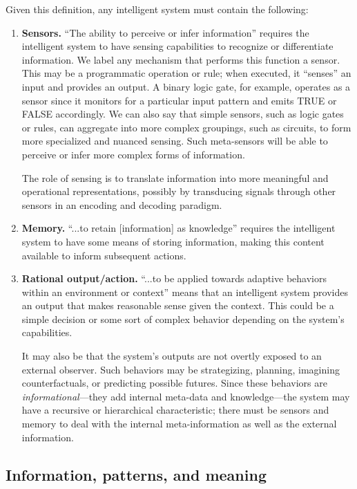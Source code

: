 Given this definition, any intelligent system must contain the following:
\begin{enumerate}
  \item \textbf{Sensors.} ``The ability to perceive or infer information'' requires the intelligent system to have sensing capabilities to recognize or differentiate information.
We label any mechanism that performs this function a sensor.
This may be a programmatic operation or rule; when executed, it ``senses'' an input and provides an output.
A binary logic gate, for example, operates as a sensor since it monitors for a particular input pattern and emits TRUE or FALSE accordingly.
We can also say that simple sensors, such as logic gates or rules, can aggregate into more complex groupings, such as circuits, to form more specialized and nuanced sensing.
Such meta-sensors will be able to perceive or infer more complex forms of information.

The role of sensing is to translate information into more meaningful and operational representations, possibly by transducing signals through other sensors in an encoding and decoding paradigm. 
  \item \textbf{Memory.} ``...to retain [information] as knowledge'' requires the intelligent system to have some means of storing information, making this content available to inform subsequent actions.
  \item \textbf{Rational output/action.} ``...to be applied towards adaptive behaviors within an environment or context'' means that an intelligent system provides an output that makes reasonable sense given the context.
This could be a simple decision or some sort of complex behavior depending on the system's capabilities.

It may also be that the system's outputs are not overtly exposed to an external observer.
Such behaviors may be strategizing, planning, imagining counterfactuals, or predicting possible futures.
Since these behaviors are \emph{informational}---they add internal meta-data and knowledge---the system may have a recursive or hierarchical characteristic; there must be sensors and memory to deal with the internal meta-information as well as the external information.

\end{enumerate}

\subsection{Information, patterns, and meaning}

